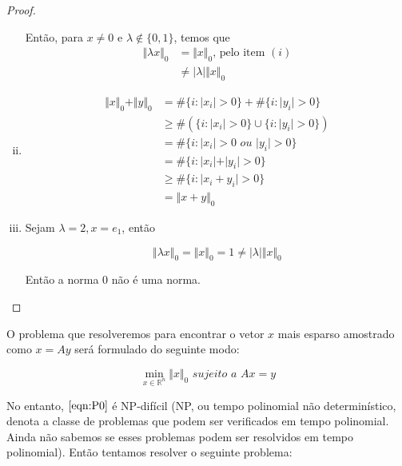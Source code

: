 \begin{proof}
\begin{enumerate}[(i)]
Então, para $x \neq 0$ e $\lambda \notin \lbrace 0, 1 \rbrace$, temos que
\begin{subequations}
\begin{align*}
\Vert \lambda x \Vert_0 & = \Vert x \Vert_0 \text{, pelo item $(i)$} \\
& \neq \vert \lambda \vert \Vert x \Vert_0
\end{align*}
\end{subequations}
\item
\begin{subequations}
\begin{align*}
\Vert x \Vert_0 + \Vert y \Vert_0 & = \# \lbrace i : \vert x_i \vert > 0 \rbrace
									+ \# \lbrace i : \vert y_i \vert > 0 \rbrace \\
& \geq \#(\lbrace i : \vert x_i \vert > 0 \rbrace \cup \lbrace i : \vert y_i \vert > 0 \rbrace) \\
& = \# \lbrace i : \vert x_i \vert > 0 \textit{ ou } \vert y_i \vert > 0 \rbrace \\
& = \# \lbrace i : \vert x_i \vert + \vert y_i \vert > 0 \rbrace \\
& \geq  \# \lbrace i : \vert x_i + y_i \vert > 0\rbrace \\
& = \Vert x + y \Vert_0
\end{align*}
\end{subequations}

\item Sejam $\lambda = 2, x = e_1$, então

$$ \Vert \lambda x \Vert_0 = \Vert x \Vert_0 = 1 \neq \vert \lambda \vert \Vert x \Vert_0 $$

Então a norma $0$ não é uma norma.
\end{enumerate}
\end{proof}

O problema que resolveremos para encontrar o vetor $x$ mais esparso amostrado como $x = Ay$ será formulado do seguinte modo:

\begin{equation}
\tag{$P_0$}
\min_{x \in \mathbb{R}^n} \Vert x \Vert_{0} \textit{ sujeito a } Ax = y
\label{eqn:P0}
\end{equation}

No entanto, $\eqref{eqn:P0}$ é NP-difícil \cite{fourau} (NP, ou tempo polinomial não determinístico, denota a classe de problemas que podem ser verificados em tempo polinomial. Ainda não sabemos se esses problemas podem ser resolvidos em tempo polinomial). Então tentamos resolver o seguinte problema:

